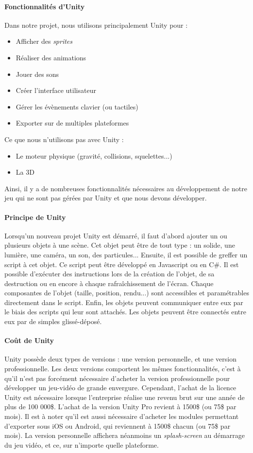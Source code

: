 \paragraph{Fonctionnalités d'Unity}
Dans notre projet, nous utilisons principalement Unity pour :
\begin{itemize}
\item Afficher des \textit{sprites}
\item Réaliser des animations
\item Jouer des sons
\item Créer l'interface utilisateur
\item Gérer les évènements clavier (ou tactiles)
\item Exporter sur de  multiples plateformes
\end{itemize}
Ce que nous n'utilisons pas avec Unity :
\begin{itemize}
\item Le moteur physique (gravité, collisions, squelettes...)
\item La 3D
\end{itemize}
Ainsi, il y a de nombreuses fonctionnalités nécessaires au développement de notre jeu qui ne sont pas gérées par Unity et que nous devons développer.
 
\paragraph{Principe de Unity}
Lorsqu'un nouveau projet Unity est démarré, il faut d'abord ajouter un ou plusieurs objets à une scène. Cet objet peut être de tout type : un solide, une lumière, une caméra, un son, des particules... Ensuite, il est possible de greffer un script à cet objet. Ce script peut être développé en Javascript ou en C\#. Il est possible d'exécuter des instructions lors de la création de l'objet, de sa destruction ou en encore à chaque rafraîchissement de l'écran. Chaque composantes de l'objet (taille, position, rendu...) sont accessibles et paramétrables directement dans le script. Enfin, les objets peuvent communiquer entre eux par le biais des scripts qui leur sont attachés. Les objets peuvent être connectés entre eux par de simples glissé-déposé.

\paragraph{Coût de Unity}
Unity possède deux types de versions : une version personnelle, et une version professionnelle. Les deux versions comportent les mêmes fonctionnalités, c'est à qu'il n'est pas forcément nécessaire d'acheter la version professionnelle pour développer un jeu-vidéo de grande envergure. Cependant, l'achat de la licence Unity est nécessaire lorsque l'entreprise réalise une revenu brut sur une année de plus de 100 000\$. L'achat de la version Unity Pro revient à 1500\$ (ou 75\$ par mois). Il est à noter qu'il est aussi nécessaire d'acheter les modules permettant d'exporter sous iOS ou Android, qui reviennent à 1500\$ chacun (ou 75\$ par mois). La version personnelle affichera néanmoins un \textit{splash-screen} au démarrage du jeu vidéo, et ce, sur n'importe quelle plateforme.


